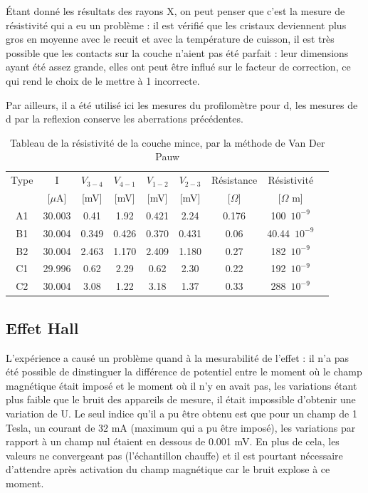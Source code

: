 \documentclass[a4paper,12pt,oneside]{article}
\begin{document}
Étant donné les résultats des rayons X, on peut penser que c'est la mesure de résistivité qui a eu un problème : il est vérifié que les cristaux deviennent plus gros en moyenne avec le recuit et avec la température de cuisson, il est très possible que les contacts sur la couche n'aient pas été parfait : leur dimensions ayant été assez grande, elles ont peut être influé sur le facteur de correction, ce qui rend le choix de le mettre à 1 incorrecte.

Par ailleurs, il a été utilisé ici les mesures du profilomètre pour d, les mesures de d par la reflexion conserve les aberrations précédentes.


\begin{table}[ht]
\centering
   \begin{tabular}{|c|c|c|c|c|c|c|c|c|}
	  \hline
      Type & I & $V_{3-4}$ & $V_{4-1}$ & $V_{1-2}$ & $V_{2-3}$ & Résistance& Résistivité\\
      &  [$\mu$A] & [mV] & [mV] & [mV] & [mV] & [$\Omega$] & [$\Omega$ m] \\
      \hline
      A1 & 30.003 & 0.41 & 1.92 & 0.421 & 2.24 & 0.176 & 100\ $10^{-9}$\\
      B1 & 30.004 & 0.349 & 0.426 & 0.370 & 0.431 & 0.06 & 40.44\ $10^{-9}$\\
      B2 & 30.004 & 2.463 & 1.170 & 2.409 & 1.180 & 0.27 & 182\ $10^{-9}$\\
      C1 & 29.996 & 0.62 & 2.29 & 0.62 & 2.30 & 0.22 & 192\ $10^{-9}$\\
      C2 & 30.004 & 3.08 & 1.22 & 3.18 & 1.37 & 0.33 & 288\ $10^{-9}$\\
      \hline
   \end{tabular}
   \caption{Tableau de la résistivité de la couche mince, par la méthode de Van Der Pauw}\label{tab:vanderpauw}
\end{table}



\subsection{Effet Hall}

L'expérience a causé un problème quand à la mesurabilité de l'effet : il n'a pas été possible de dinstinguer la différence de potentiel entre le moment où le champ magnétique était imposé et le moment où il n'y en avait pas, les variations étant plus faible que le bruit des appareils de mesure, il était impossible d'obtenir une variation de U. Le seul indice qu'il a pu être obtenu est que pour un champ de 1 Tesla, un courant de 32 mA (maximum qui a pu être imposé), les variations par rapport à un champ nul étaient en dessous de 0.001 mV. En plus de cela, les valeurs ne convergeant pas (l'échantillon chauffe) et il est pourtant nécessaire d'attendre après activation du champ magnétique car le bruit explose à ce moment.
\end{document}
